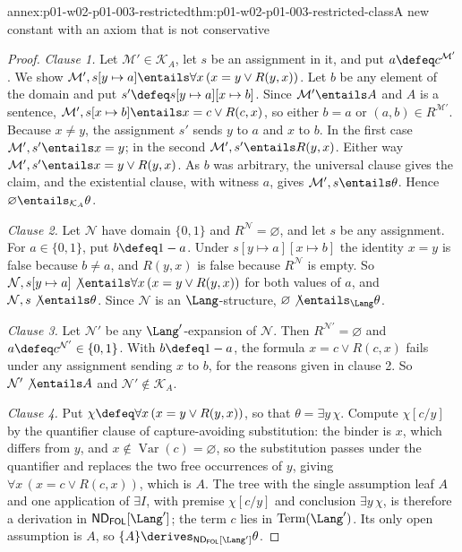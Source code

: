 \begin{annexitem}{annex:p01-w02-p01-003-restricted}{thm:p01-w02-p01-003-restricted-class}{A new constant with an axiom that is not conservative}
\begin{proof}
\emph{Clause 1.} Let \(\mathcal M'\in\mathcal K_A\), let \(s\) be an
assignment in it, and put \(a\defeq c^{\mathcal M'}\). We show
\(\mathcal M',s[y\mapsto a]\entails\forall x\,(x=y\lor R(y,x))\). Let \(b\)
be any element of the domain and put \(s'\defeq s[y\mapsto a][x\mapsto b]\).
Since \(\mathcal M'\entails A\) and \(A\) is a sentence,
\(\mathcal M',s[x\mapsto b]\entails x=c\lor R(c,x)\), so either \(b=a\) or
\((a,b)\in R^{\mathcal M'}\). Because \(x\ne y\), the assignment \(s'\) sends
\(y\) to \(a\) and \(x\) to \(b\). In the first case
\(\mathcal M',s'\entails x=y\); in the second
\(\mathcal M',s'\entails R(y,x)\). Either way
\(\mathcal M',s'\entails x=y\lor R(y,x)\). As \(b\) was arbitrary, the
universal clause gives the claim, and the existential clause, with witness
\(a\), gives \(\mathcal M',s\entails\theta\). Hence
\(\varnothing\entails_{\mathcal K_A}\theta\).

\emph{Clause 2.} Let \(\mathcal N\) have domain \(\{0,1\}\) and
\(R^{\mathcal N}=\varnothing\), and let \(s\) be any assignment. For
\(a\in\{0,1\}\), put \(b\defeq1-a\). Under
\(s[y\mapsto a][x\mapsto b]\) the identity \(x=y\) is false because
\(b\ne a\), and \(R(y,x)\) is false because \(R^{\mathcal N}\) is empty.
So \(\mathcal N,s[y\mapsto a]\not\entails\forall x\,(x=y\lor R(y,x))\)
for both values of \(a\), and \(\mathcal N,s\not\entails\theta\). Since
\(\mathcal N\) is an \(\Lang\)-structure, \(\varnothing\not\entails_{\Lang}\theta\).

\emph{Clause 3.} Let \(\mathcal N'\) be any \(\Lang'\)-expansion of
\(\mathcal N\). Then \(R^{\mathcal N'}=\varnothing\) and
\(a\defeq c^{\mathcal N'}\in\{0,1\}\). With \(b\defeq1-a\), the formula
\(x=c\lor R(c,x)\) fails under any assignment sending \(x\) to \(b\), for the
reasons given in clause 2. So \(\mathcal N'\not\entails A\) and
\(\mathcal N'\notin\mathcal K_A\).

\emph{Clause 4.} Put \(\chi\defeq\forall x\,(x=y\lor R(y,x))\), so that
\(\theta=\exists y\,\chi\). Compute \(\chi[c/y]\) by the quantifier clause of
capture-avoiding substitution: the binder is \(x\), which differs from \(y\),
and \(x\notin\operatorname{Var}(c)=\varnothing\), so the substitution passes
under the quantifier and replaces the two free occurrences of \(y\), giving
\(\forall x\,(x=c\lor R(c,x))\), which is \(A\). The tree with the single
assumption leaf \(A\) and one application of \(\exists I\), with premise
\(\chi[c/y]\) and conclusion \(\exists y\,\chi\), is therefore a derivation
in \(\mathsf{ND}_{\mathsf{FOL}}[\Lang']\); the term \(c\) lies in
\(\operatorname{Term}(\Lang')\). Its only open assumption is \(A\), so
\(\{A\}\derives_{\mathsf{ND}_{\mathsf{FOL}}[\Lang']}\theta\).
\end{proof}
\end{annexitem}
